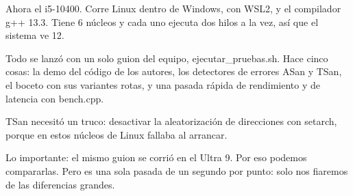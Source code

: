 Ahora el i5-10400. Corre Linux dentro de Windows, con WSL2, y el compilador g++ 13.3. Tiene 6 núcleos y cada uno ejecuta dos hilos a la vez, así que el sistema ve 12.

Todo se lanzó con un solo guion del equipo, ejecutar\_pruebas.sh. Hace cinco cosas: la demo del código de los autores, los detectores de errores ASan y TSan, el boceto con sus variantes rotas, y una pasada rápida de rendimiento y de latencia con bench.cpp.

TSan necesitó un truco: desactivar la aleatorización de direcciones con setarch, porque en estos núcleos de Linux fallaba al arrancar.

Lo importante: el mismo guion se corrió en el Ultra 9. Por eso podemos compararlas. Pero es una sola pasada de un segundo por punto: solo nos fiaremos de las diferencias grandes.
